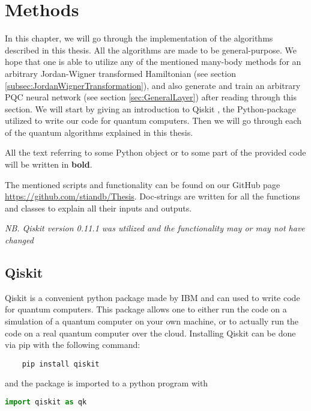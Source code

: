 \chapter{Methods}
\label{chap:Methods}
In this chapter, we will go through the implementation of the algorithms described in this thesis. All the algorithms are made to be general-purpose. We hope that one is able to utilize any of the mentioned many-body methods for an arbitrary Jordan-Wigner transformed Hamiltonian (see section \ref{subsec:JordanWignerTransformation}), and also generate and train an arbitrary PQC neural network (see section \ref{sec:GeneralLayer}) after reading through this section.
We will start by giving an introduction to Qiskit \cite{qiskit}, the Python-package utilized to write our code for quantum computers. Then we will go through each of the quantum algorithms explained in this thesis.

All the text referring to some Python object or to some part of the provided code will be written in \textbf{bold}.

The mentioned scripts and functionality can be found on our GitHub page \url{https://github.com/stiandb/Thesis}.\newline
Doc-strings are written for all the functions and classes to explain all their inputs and outputs.

\textit{NB. Qiskit version 0.11.1 was utilized and the functionality may or may not have changed}


\section{Qiskit}
\label{sec:MethodsQiskit}

Qiskit \cite{qiskit} is a convenient python package made by IBM and can used to write code for quantum computers. This package allows one to either run the code on a simulation of a quantum computer on your own machine, or to actually run the code on a real quantum computer over the cloud. Installing Qiskit can be done via pip with the following command:
\begin{verbatim}
    pip install qiskit
\end{verbatim}
and the package is imported to a python program with
\begin{lstlisting}[language=Python,numbers=none]
import qiskit as qk
\end{lstlisting}


